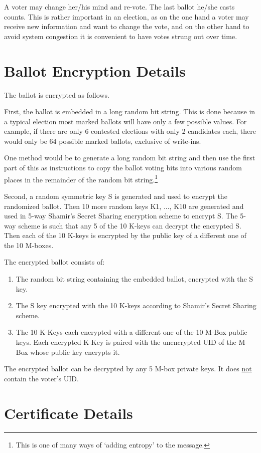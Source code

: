 \documentclass[12pt]{article}
\begin{document}
A voter may change her/his mind and re-vote.  The last ballot
he/she casts counts.  This is rather important in an election,
as on the one hand a voter may receive new information and
want to change the vote, and on the other hand to avoid system
congestion it is convenient to have votes strung out over time.

\section{Ballot Encryption Details}

The ballot is encrypted as follows.

First, the ballot is embedded in a long random bit string.
This is done because in a typical election most marked ballots will
have only a few possible values.  For example, if there are only
6 contested elections with only 2 candidates each, there would only
be 64 possible marked ballots, exclusive of write-ins.

One method would be to generate a long random bit string and then
use the first part of this as instructions to copy the ballot voting bits into
various random places in the remainder of the random bit string.\footnote{
This is one of many ways of `adding entropy' to the message.}

Second, a random symmetric key S is generated and used to encrypt
the randomized ballot.  Then 10 more random keys K1, ..., K10 are generated
and used in 5-way Shamir's Secret Sharing encryption
scheme to encrypt S.  The 5-way
scheme is such that any 5 of the 10 K-keys can decrypt the encrypted S.
Then each of the 10 K-keys is encrypted by the public key
of a different one of the 10 M-boxes.

The encrypted ballot consists of:
\begin{enumerate}
\item The random bit string containing the embedded ballot,
      encrypted with the S key.
\item The S key encrypted with the 10 K-keys according to
      Shamir's Secret Sharing scheme.
\item The 10 K-Keys each encrypted with a
      different one of the 10 M-Box public keys.
      Each encrypted K-Key is paired with the unencrypted
      UID of the M-Box whose public key encrypts it.
\end{enumerate}
The encrypted ballot can be decrypted
by any 5 M-box private keys.
It does \underline{not} contain the voter's UID.

\section{Certificate Details}
\label{CERTIFICATE-DETAILS}
\end{document}
